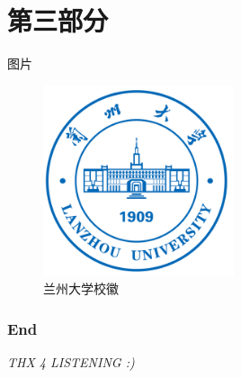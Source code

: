\documentclass{ldr-simple-gray}
\begin{document}
  \section{第三部分}
  \begin{frame}{图片}
    \begin{figure}
      \centering
      \includegraphics[width=0.5\textwidth]{./figures/lzu_logo.png}
      \caption{兰州大学校徽}
    \end{figure}
  \end{frame}

  \begin{frame} %
    \frametitle{End}
    \begin{center}
      \Huge \emph{THX 4 LISTENING :)}
    \end{center}
  \end{frame}
\end{document}
